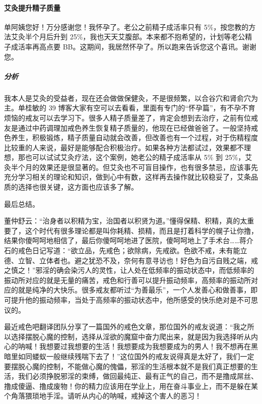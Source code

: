 \paragraph{艾灸提升精子质量}

\begin{case}[不孕不育]
    单阿姨您好！万分感谢您！我怀孕了。老公之前精子成活率只有 5\%，按您教的方法艾灸半个月后升到 25\%，我也天天艾腹部。本来都不抱希望的，计划等老公精子成活率再高点要 BB。这期间，我居然怀孕了。所以跑来告诉您这个喜讯。谢谢您。
    \subparagraph{分析} 我本人是艾灸的受益者，现在还会做做保健灸，不是很频繁，以合谷穴和肾俞穴为主。单桂敏的 39 博客大家有空可以去看看，里面有专门的“怀孕篇”，有不孕不育烦恼的戒友可以去学习下。很多人精子质量差了，肯定会想到去治疗，之前有位戒友是通过中药调理加戒色养生恢复精子质量的，他现在已经做爸爸了。一般坚持戒色养生，积极锻炼，精子质量自动就会改善，但改善也有一个过程，对于伤精程度比较重的人来说，最好是能够配合积极治疗。如果各种方法都试过，效果都不理想，那也可以试试艾灸疗法，这个案例，她老公的精子成活率从 5\% 到 25\%，艾灸半个月的效果还是很显著的。但艾灸也不可盲目操作，也有很多禁忌，应该事先充分学习相关的理论和知识，做到心中有数，这样再去操作就比较稳妥了，艾条品质的选择也很关键，这方面也应该多了解。
\end{case}

最后总结。

董仲舒云：“治身者以积精为宝，治国者以积贤为道。”懂得保精、积精，真的太重要了，这个时代有很多理论都是叫你耗精、损精，而且是打着科学的幌子让你撸，结果你傻呵呵地相信了，最后你傻呵呵地进了医院，傻呵呵地上了手术台……蒋介石的戒色日记写道：“欲立品，先戒色；欲除病，先戒欲。色欲不戒，未有能立德、立智、立体者也。避之犹恐不及，奈何有意寻访也！好色为自污自贱之端，戒之慎之！”邪淫的确会染污人的灵性，让人处在低频率的振动状态中，而低频率的振动所对应的就是无量的痛苦，戒色和行善可以提升振动频率，高频率的振动所对应的就是纯净的大快乐。很多戒友都听过“为善最乐”，一个人发善心和做善事，即可提升他的振动频率，当处于高频率的振动状态中，他所感受的快乐绝对是不可思议的。

最近戒色吧翻译团队分享了一篇国外的戒色文章，那位国外的戒友说道：“我之所以选择摆脱心魔的控制，选择从淫欲的魔窟中奋力爬出来，就是因为我选择听从内心的呐喊！我想要过我想要的生活！我想要成为我想要成为的男人！我不想再在黑暗里如同蝼蚁一般继续残喘下去了！”这位国外的戒友说得真是太好了，我们一定要摆脱心魔的控制，不能做心魔的傀儡，邪淫的生活根本就不是我们真正想要的生活，我们必须挣脱邪淫的束缚，做回最纯正、最有正气的自己，而不是撸成屌丝、撸成傻逼、撸成废物！你的精力应该用在学业上，用在奋斗事业上，而不是躲在某个角落猥琐地手淫。请听从内心的呐喊，戒掉这个害人的恶习！

